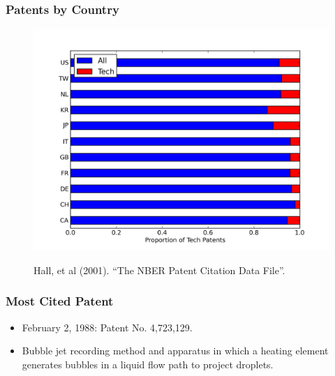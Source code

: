 \documentclass{beamer}
\begin{document}
\begin{frame}[t]\frametitle{Patents by Country} 
\fontsize{6pt}{7.2}\selectfont
\!\!\!\!\!\!\!\!\!\!\!\!\!
\begin{figure}[T]
  \begin{center}
    \includegraphics[scale=.5]{by_country_normalized.png}
    \label{fig:by_country_normalized}
  \end{center}
  \!\!\!\!\!
  Hall, et al (2001). ``The NBER Patent Citation Data File''.

\end{figure}
\end{frame}

\begin{frame}[t]\frametitle{Most Cited Patent} 
  \begin{itemize}
    \item<+-> February 2, 1988: Patent No. 4,723,129.
    \item<+-> Bubble jet recording method and apparatus in which a heating element generates bubbles in a liquid flow path to project droplets.
  \end{itemize}
\end{frame}
\end{document}

